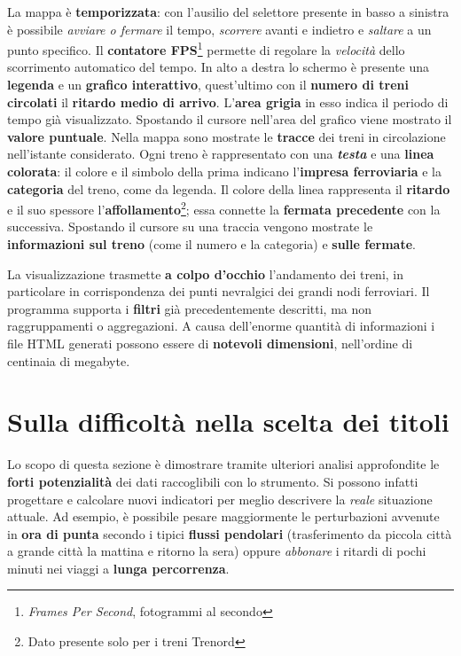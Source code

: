 \documentclass[12pt,italian]{report}
\begin{document}
La mappa è \textbf{temporizzata}: con l'ausilio del selettore presente
in basso a sinistra è possibile \textit{avviare o fermare} il tempo,
\textit{scorrere} avanti e indietro e \textit{saltare} a un punto
specifico.  Il \textbf{contatore FPS}\footnote{\textit{Frames Per
        Second}, fotogrammi al secondo} permette di regolare la
\textit{velocità} dello scorrimento automatico del tempo.  In alto a
destra lo schermo è presente una \textbf{legenda} e un \textbf{grafico
    interattivo}, quest'ultimo con il \textbf{numero di treni
    circolati} il \textbf{ritardo medio di arrivo}.  L'\textbf{area
    grigia} in esso indica il periodo di tempo già visualizzato.
Spostando il cursore nell'area del grafico viene mostrato il
\textbf{valore puntuale}.  Nella mappa sono mostrate le
\textbf{tracce} dei treni in circolazione nell'istante considerato.
Ogni treno è rappresentato con una \textbf{\textit{testa}} e una
\textbf{linea colorata}: il colore e il simbolo della prima indicano
l'\textbf{impresa ferroviaria} e la \textbf{categoria} del treno, come
da legenda.  Il colore della linea rappresenta il \textbf{ritardo} e
il suo spessore l'\textbf{affollamento}\footnote{Dato presente solo
    per i treni Trenord}; essa connette la \textbf{fermata precedente}
con la successiva.  Spostando il cursore su una traccia vengono
mostrate le \textbf{informazioni sul treno} (come il numero e la
categoria) e \textbf{sulle fermate}.

La visualizzazione trasmette \textbf{a colpo d'occhio} l'andamento dei
treni, in particolare in corrispondenza dei punti nevralgici dei
grandi nodi ferroviari.  Il programma supporta i \textbf{filtri} già
precedentemente descritti, ma non raggruppamenti o aggregazioni.  A
causa dell'enorme quantità di informazioni i file HTML generati
possono essere di \textbf{notevoli dimensioni}, nell'ordine di
centinaia di megabyte.

\section{Sulla difficoltà nella scelta dei titoli}

Lo scopo di questa sezione è dimostrare tramite ulteriori analisi
approfondite le \textbf{forti potenzialità} dei dati raccoglibili con
lo strumento.  Si possono infatti progettare e calcolare nuovi
indicatori per meglio descrivere la \textit{reale} situazione attuale.
Ad esempio, è possibile pesare maggiormente le perturbazioni avvenute
in \textbf{ora di punta} secondo i tipici \textbf{flussi pendolari}
(trasferimento da piccola città a grande città la mattina e ritorno la
sera) oppure \textit{abbonare} i ritardi di pochi minuti nei viaggi a
\textbf{lunga percorrenza}.
\end{document}
